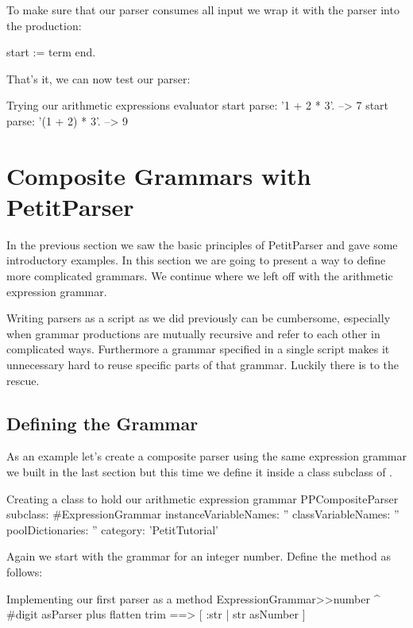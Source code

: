 \documentclass[a4paper,10pt,twoside]{book}
\begin{document}
To make sure that our parser consumes all input we wrap it with the
 parser into the  production:

\begin{code}{}
start := term end.
\end{code}

That's it, we can now test our parser:

\begin{script}{Trying our arithmetic expressions evaluator}
start parse: '1 + 2 * 3'.       --> 7
start parse: '(1 + 2) * 3'.     --> 9
\end{script}

\section{Composite Grammars with PetitParser}

In the previous section we saw the basic principles of PetitParser and
gave some introductory examples. In this section we are going to
present a way to define more complicated grammars. We continue where
we left off with the arithmetic expression grammar.

Writing parsers as a script as we did previously can be cumbersome,
especially when grammar productions are mutually recursive and refer
to each other in complicated ways. Furthermore a grammar specified in
a single script makes it unnecessary hard to reuse specific parts of
that grammar. Luckily there is  to the rescue.

\subsection{Defining the Grammar}

As an example let's create a composite parser using the same
expression grammar we built in the last section but this time we define
it inside a  class subclass of .

\begin{script}{Creating a class to hold our arithmetic expression grammar}
PPCompositeParser subclass: #ExpressionGrammar
   instanceVariableNames: ''
   classVariableNames: ''
   poolDictionaries: ''
   category: 'PetitTutorial'
\end{script}

Again we start with the grammar for an integer number. Define the
method  as follows:

\begin{script}{Implementing our first parser as a method}
ExpressionGrammar>>number
   ^ #digit asParser plus flatten trim ==> [ :str | str asNumber ]
\end{script}
\end{document}
